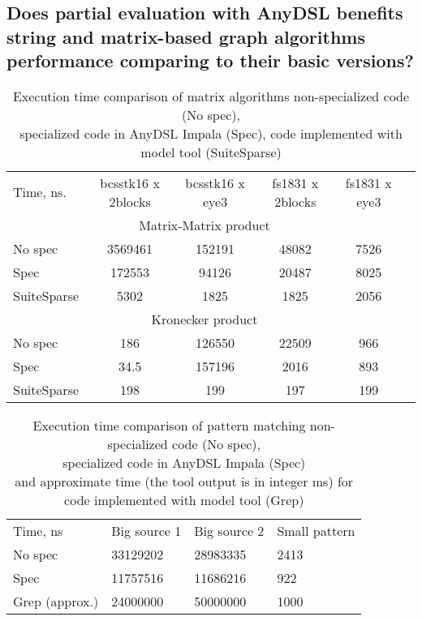 \documentclass[conference]{IEEEtran}
\begin{document}
\subsection{Does partial evaluation with AnyDSL benefits string and matrix-based graph algorithms performance comparing to their basic versions?}


\begin{table*}[!h]
\begin{tabular}{lccccc}

		Time, ns.   & bcsstk16 x 2blocks & bcsstk16 x eye3 & fs1831 x 2blocks & fs1831 x eye3 \\
		\multicolumn{5}{c}{Matrix-Matrix product}                                             \\
		No spec     & 3569461            & 152191          & 48082            & 7526          \\
		Spec        & 172553             & 94126           & 20487            & 8025          \\
		SuiteSparse & 5302               & 1825            & 1825             & 2056          \\
		\multicolumn{5}{c}{Kronecker product}                                                 \\
		No spec     & 186                & 126550          & 22509            & 966           \\
		Spec        & 34.5               & 157196          & 2016             & 893           \\
		SuiteSparse & 198                & 199             & 197              & 199          
\end{tabular}
\centering
\caption{Execution time comparison of matrix algorithms non-specialized code (No spec),\\ specialized code in AnyDSL Impala (Spec), code implemented with model tool (SuiteSparse)}
\label{table_graph}
\end{table*}



\begin{table*}[]
	\begin{tabular}{llll}
		Time, ns       & Big source 1 & Big source 2 & Small pattern \\
		No spec        & 33129202     & 28983335     & 2413          \\
		Spec           & 11757516     & 11686216     & 922           \\
		Grep (approx.) & 24000000     & 50000000     & 1000                   
	\end{tabular}
	\centering
	\caption{Execution time comparison of pattern matching non-specialized code (No spec),\\ specialized code in AnyDSL Impala (Spec) \\ and approximate time (the tool output is in integer ms) for code implemented with model tool (Grep)}
	\label{table_string}
\end{table*}
\end{document}
